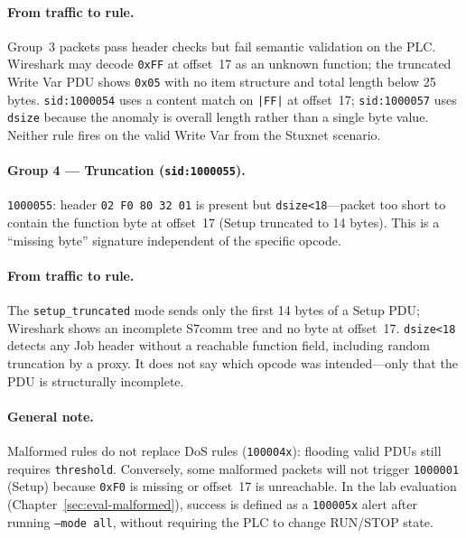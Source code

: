 \paragraph{From traffic to rule.}
Group~3 packets pass header checks but fail semantic validation on the PLC. Wireshark may decode \texttt{0xFF} at offset~17 as an unknown function; the truncated Write Var PDU shows \texttt{0x05} with no item structure and total length below 25 bytes. \texttt{sid:1000054} uses a content match on \texttt{|FF|} at offset~17; \texttt{sid:1000057} uses \texttt{dsize} because the anomaly is overall length rather than a single byte value. Neither rule fires on the valid Write Var from the Stuxnet scenario.

\paragraph{Group 4 --- Truncation (\texttt{sid:1000055}).}

\texttt{1000055}: header \texttt{02 F0 80 32 01} is present but \texttt{dsize<18}---packet too short to contain the function byte at offset~17 (Setup truncated to 14 bytes). This is a ``missing byte'' signature independent of the specific opcode.

\paragraph{From traffic to rule.}
The \texttt{setup\_truncated} mode sends only the first 14 bytes of a Setup PDU; Wireshark shows an incomplete S7comm tree and no byte at offset~17. \texttt{dsize<18} detects any Job header without a reachable function field, including random truncation by a proxy. It does not say which opcode was intended---only that the PDU is structurally incomplete.

\paragraph{General note.}
Malformed rules do not replace DoS rules (\texttt{100004x}): flooding valid PDUs still requires \texttt{threshold}. Conversely, some malformed packets will not trigger \texttt{1000001} (Setup) because \texttt{0xF0} is missing or offset~17 is unreachable. In the lab evaluation (Chapter~\ref{sec:eval-malformed}), success is defined as a \texttt{100005x} alert after running \texttt{--mode all}, without requiring the PLC to change RUN/STOP state.


